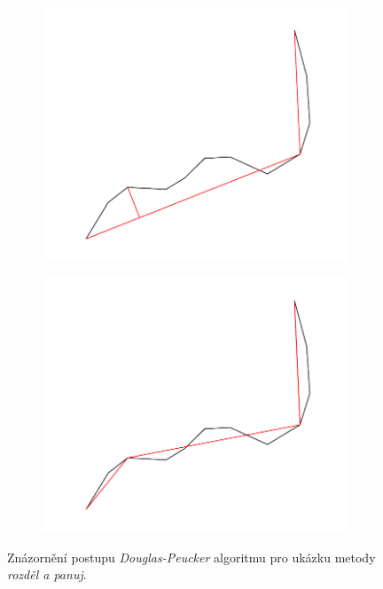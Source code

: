 \begin{figure}[h]
\begin{subfigure}{0.5\textwidth}
  \includegraphics[width=\linewidth]{./pictures/4/douglas-peucker_3.pdf}
  \label{fig:3-douglas-peucker_3}
\end{subfigure}\hfil %
\begin{subfigure}{0.5\textwidth}
  \includegraphics[width=\linewidth]{./pictures/4/douglas-peucker_4.pdf}
  \label{fig:3-douglas-peucker_4}
\end{subfigure}\hfil %
\caption{Znázornění postupu \textit{Douglas-Peucker} algoritmu pro ukázku metody \textit{rozděl a panuj}.}
\label{fig:3-douglas-peucker}
\end{figure}
	

